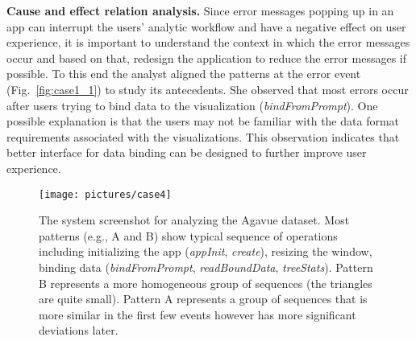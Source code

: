 \textbf{Cause and effect relation analysis.} Since error messages popping up in an app can interrupt the users' analytic workflow and have a negative effect on user experience, it is important to understand the context in which the error messages occur and based on that, redesign the application to reduce the error messages if possible. To this end the analyst aligned the patterns at the error event (Fig.~\ref{fig:case1_1}) to study its antecedents. She observed that most errors occur after users trying to bind data to the visualization (\textit{bindFromPrompt}). One possible explanation is that the users may not be familiar with the data format requirements associated with the visualizations. This observation indicates that better interface for data binding can be designed to further improve user experience.

\begin{figure*}[t]
	\centering
	\texttt{[image: pictures/case4]}
	\caption{The system screenshot for analyzing the Agavue dataset. Most patterns (e.g., A and B) show typical sequence of operations including initializing the app (\textit{appInit}, \textit{create}), resizing the window, binding data (\textit{bindFromPrompt}, \textit{readBoundData}, \textit{treeStats}). Pattern B represents a more homogeneous group of sequences (the triangles are quite small). Pattern A represents a group of sequences that is more similar in the first few events however has more significant deviations later.
	}
	\label{fig:case1_0}
\end{figure*}










